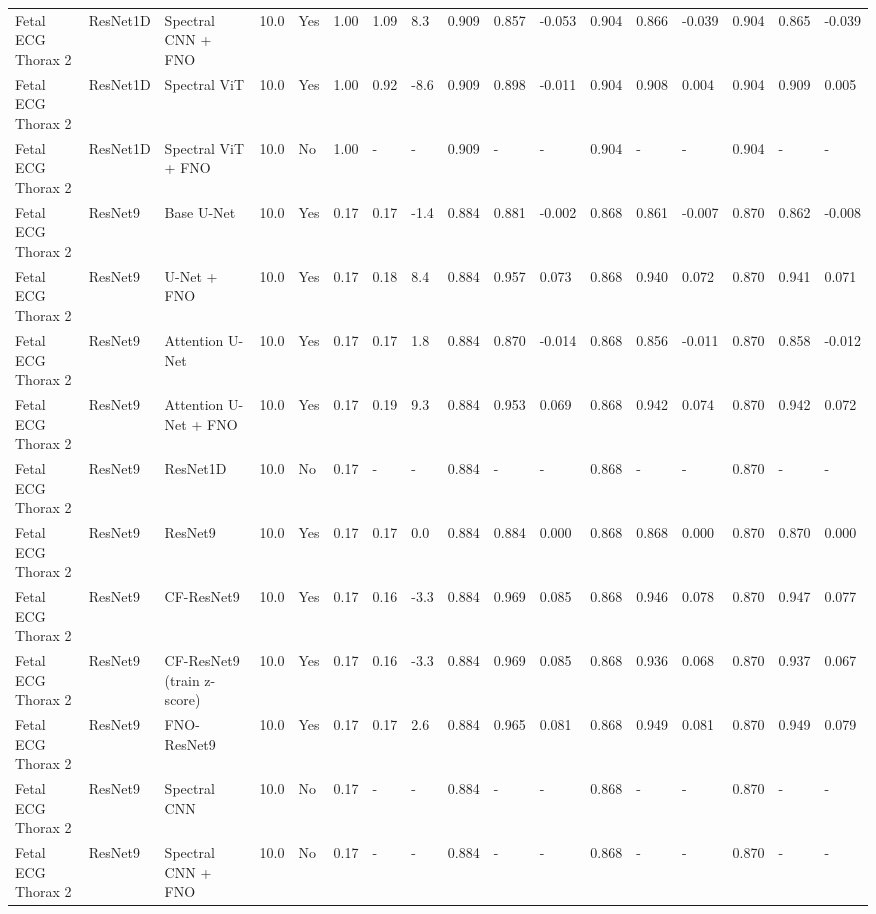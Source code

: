 \begin{longtable}{lllllllllllllllll}
Fetal ECG Thorax 2 & ResNet1D & Spectral CNN + FNO & 10.0 & Yes & 1.00 & 1.09 & 8.3 & 0.909 & 0.857 & -0.053 & 0.904 & 0.866 & -0.039 & 0.904 & 0.865 & -0.039 \\
Fetal ECG Thorax 2 & ResNet1D & Spectral ViT & 10.0 & Yes & 1.00 & 0.92 & -8.6 & 0.909 & 0.898 & -0.011 & 0.904 & 0.908 & 0.004 & 0.904 & 0.909 & 0.005 \\
Fetal ECG Thorax 2 & ResNet1D & Spectral ViT + FNO & 10.0 & No & 1.00 & - & - & 0.909 & - & - & 0.904 & - & - & 0.904 & - & - \\
Fetal ECG Thorax 2 & ResNet9 & Base U-Net & 10.0 & Yes & 0.17 & 0.17 & -1.4 & 0.884 & 0.881 & -0.002 & 0.868 & 0.861 & -0.007 & 0.870 & 0.862 & -0.008 \\
Fetal ECG Thorax 2 & ResNet9 & U-Net + FNO & 10.0 & Yes & 0.17 & 0.18 & 8.4 & 0.884 & 0.957 & 0.073 & 0.868 & 0.940 & 0.072 & 0.870 & 0.941 & 0.071 \\
Fetal ECG Thorax 2 & ResNet9 & Attention U-Net & 10.0 & Yes & 0.17 & 0.17 & 1.8 & 0.884 & 0.870 & -0.014 & 0.868 & 0.856 & -0.011 & 0.870 & 0.858 & -0.012 \\
Fetal ECG Thorax 2 & ResNet9 & Attention U-Net + FNO & 10.0 & Yes & 0.17 & 0.19 & 9.3 & 0.884 & 0.953 & 0.069 & 0.868 & 0.942 & 0.074 & 0.870 & 0.942 & 0.072 \\
Fetal ECG Thorax 2 & ResNet9 & ResNet1D & 10.0 & No & 0.17 & - & - & 0.884 & - & - & 0.868 & - & - & 0.870 & - & - \\
Fetal ECG Thorax 2 & ResNet9 & ResNet9 & 10.0 & Yes & 0.17 & 0.17 & 0.0 & 0.884 & 0.884 & 0.000 & 0.868 & 0.868 & 0.000 & 0.870 & 0.870 & 0.000 \\
Fetal ECG Thorax 2 & ResNet9 & CF-ResNet9 & 10.0 & Yes & 0.17 & 0.16 & -3.3 & 0.884 & 0.969 & 0.085 & 0.868 & 0.946 & 0.078 & 0.870 & 0.947 & 0.077 \\
Fetal ECG Thorax 2 & ResNet9 & CF-ResNet9 (train z-score) & 10.0 & Yes & 0.17 & 0.16 & -3.3 & 0.884 & 0.969 & 0.085 & 0.868 & 0.936 & 0.068 & 0.870 & 0.937 & 0.067 \\
Fetal ECG Thorax 2 & ResNet9 & FNO-ResNet9 & 10.0 & Yes & 0.17 & 0.17 & 2.6 & 0.884 & 0.965 & 0.081 & 0.868 & 0.949 & 0.081 & 0.870 & 0.949 & 0.079 \\
Fetal ECG Thorax 2 & ResNet9 & Spectral CNN & 10.0 & No & 0.17 & - & - & 0.884 & - & - & 0.868 & - & - & 0.870 & - & - \\
Fetal ECG Thorax 2 & ResNet9 & Spectral CNN + FNO & 10.0 & No & 0.17 & - & - & 0.884 & - & - & 0.868 & - & - & 0.870 & - & - \\

\end{longtable}
